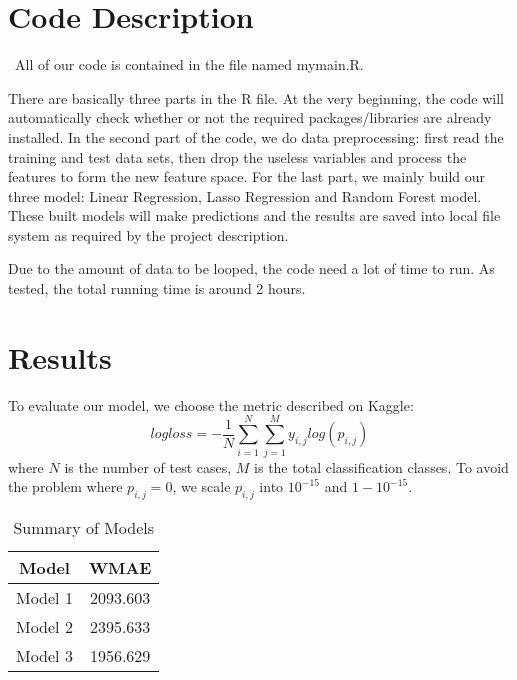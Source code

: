 \documentclass[12pt]{article}
\begin{document}
\section{Code Description}
\quad\ All of our code is contained in the file named mymain.R. 


There are basically three parts in the R file. At the very beginning, the code will automatically check whether or not the required packages/libraries are already installed. In the second part of the code, we do data preprocessing: first read the training and test data sets, then drop the useless variables and process the features to form the new feature space. For the last part, we mainly build our three model: Linear Regression, Lasso Regression and Random Forest model. These built models will make predictions and the results are saved into local file system as required by the project description.

Due to the amount of data to be looped, the code need a lot of time to run. As tested, the total running time is around 2 hours.

\section{Results}

To evaluate our model, we choose the metric described on Kaggle:
\begin{equation}
logloss = - \frac{1}{N} \sum_{i=1}^N \sum_{j=1}^M y_{i, j} log(p_{i, j})
\end{equation}
where $N$ is the number of test cases, $M$ is the total classification classes. To avoid the problem where $p_{i, j} = 0$, we scale $p_{i, j}$ into $10 ^ {-15}$ and $1 - 10 ^ {-15}$.

\begin{table}[htb]
 \caption{Summary of Models} \label{result}
 \vspace{0.1in}
\begin{center}
  \begin{tabular}{  c  c  }
  
    \hline
    Model          &WMAE     \\ \hline
    Model 1         & 2093.603    \\ \hline
    Model 2         & 2395.633    \\ \hline
    Model 3         & 1956.629    \\ \hline
  \end{tabular}
\end{center}
\end{table}
\end{document}
